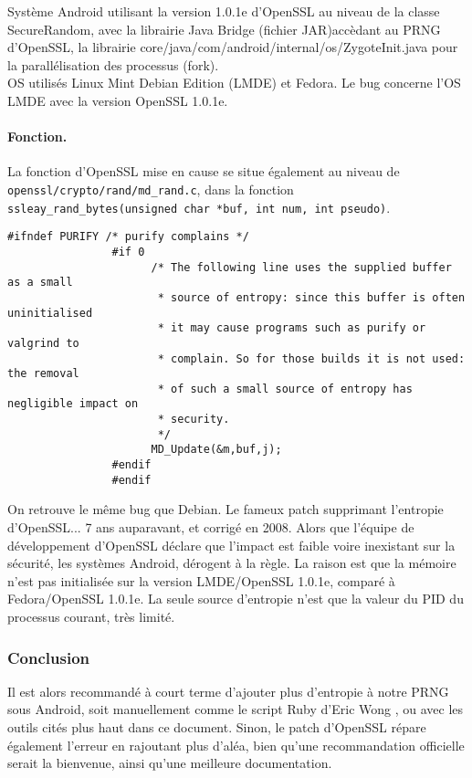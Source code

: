 			Système Android utilisant la version 1.0.1e d'OpenSSL au 
			niveau de la classe SecureRandom, avec la librairie Java Bridge 
			(fichier JAR)accèdant au PRNG d'OpenSSL, la librairie 
			core/java/com/android/internal/os/ZygoteInit.java pour 
			la parallélisation des processus (fork).\\
			
			OS utilisés Linux Mint Debian Edition (LMDE) et Fedora.
			Le bug concerne l'OS LMDE avec la version OpenSSL 1.0.1e.
			
			\paragraph{Fonction.\\}
			
			La fonction d'OpenSSL mise en cause se situe également
			au niveau de \texttt{openssl/crypto/rand/md\_rand.c}, dans
			la fonction \texttt{ssleay\_rand\_bytes(unsigned char *buf, 
			int num, int pseudo)}.
		
			\begin{lstlisting}[style=customc,caption=ssleay\_rand\_bytes.c,
			 label=ssleayrandbytes]
				#ifndef PURIFY /* purify complains */
				#if 0
				      /* The following line uses the supplied buffer as a small
				       * source of entropy: since this buffer is often uninitialised
				       * it may cause programs such as purify or valgrind to
				       * complain. So for those builds it is not used: the removal
				       * of such a small source of entropy has negligible impact on
				       * security.
				       */
				      MD_Update(&m,buf,j);
				#endif
				#endif
			\end{lstlisting}
			
			On retrouve le même bug que Debian. Le fameux patch supprimant 
			l'entropie d'OpenSSL... 7 ans auparavant, et corrigé en 2008.		
			Alors que l'équipe de développement d'OpenSSL déclare que l'impact
			est faible voire inexistant sur la sécurité, les systèmes Android, 
			dérogent à la règle. La raison est que la mémoire n'est pas initialisée
			sur la version LMDE/OpenSSL 1.0.1e, comparé à Fedora/OpenSSL 1.0.1e.			
			La seule source d'entropie n'est que la valeur du PID du processus
			courant, très limité.

		\subsubsection{Conclusion}		
		
			Il est alors recommandé à court terme d'ajouter plus d'entropie à
			notre PRNG sous Android, soit manuellement comme le script Ruby
			d'Eric Wong \cite{boblet2013android}, ou avec les outils cités plus
			haut dans ce document.			
			Sinon, le patch d'OpenSSL \cite{alex2013android} répare également
			l'erreur en rajoutant plus d'aléa, bien qu'une recommandation 
			officielle serait la bienvenue, ainsi qu'une meilleure 
			documentation.\\


